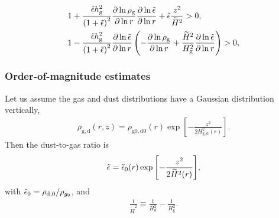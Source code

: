 



\begin{align} 
  &1 + \frac{\tilde{\epsilon} h_\mathrm{g}^2}{\left(1+
    \tilde{\epsilon}\right)^2}\frac{\partial\ln{\rho_\mathrm{g}}}{\partial\ln{r}}
  \frac{\partial\ln{\tilde{\epsilon}}}{\partial\ln{r}} +
  \tilde{\epsilon}\frac{z^2}{\widetilde{H}^2}>0,   \\ 
&1 - \frac{\tilde{\epsilon}
  h_\mathrm{g}^2}{\left(1+\tilde{\epsilon}\right)^2}
  \frac{\partial\ln{\tilde{\epsilon}}}{\partial\ln{r}}\left(-\frac{\partial\ln{\rho_\mathrm{g}}}{\partial\ln{r}}+\frac{\widetilde{H}^2}{H_\mathrm{g}^2}\frac{\partial\ln{\tilde{\epsilon}}}{\partial\ln{r}}\right) > 0,
\end{align}





\subsubsection{Order-of-magnitude estimates}
Let us assume the gas and dust distributions have a Gaussian
distribution vertically,
\begin{align}
  \rho_\mathrm{g,d}(r,z) = \rho_\mathrm{g0,d0}(r) \exp
      {\left[-\frac{z^2}{2H^2_\mathrm{g,d}(r)}\right]}.
\end{align}
Then the dust-to-gas ratio is 
\begin{align}
  \tilde{\epsilon} = \tilde{\epsilon}_0(r)
  \exp{\left[-\frac{z^2}{2\widetilde{H}^2(r)}\right]}, 
\end{align}
with $\tilde{\epsilon}_0= \rho_\mathrm{d,0}/\rho_{g_0}$, and  
\begin{align}
  \frac{1}{\widetilde{H}^2} \equiv \frac{1}{H_\mathrm{d}^2} -
  \frac{1}{H_\mathrm{g}^2}. 
\end{align}

